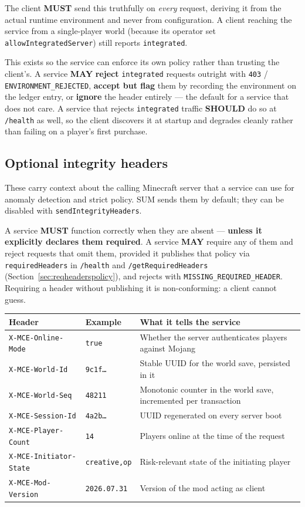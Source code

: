 \documentclass[11pt,a4paper]{article}
\newcommand{\code}[1]{\texttt{\small #1}}
\newcommand{\req}{\textbf{MUST}}
\newcommand{\rec}{\textbf{SHOULD}}
\newcommand{\opt}{\textbf{MAY}}
\begin{document}
The client \req{} send this truthfully on \emph{every} request, deriving it from the actual runtime
environment and never from configuration. A client reaching the service from a single-player world
(because its operator set \code{allowIntegratedServer}) still reports \code{integrated}.

This exists so the service can enforce its own policy rather than trusting the client's. A service
\opt{} \textbf{reject} \code{integrated} requests outright with \code{403} /
\code{ENVIRONMENT\_REJECTED}, \textbf{accept but flag} them by recording the environment on the
ledger entry, or \textbf{ignore} the header entirely --- the default for a service that does not
care. A service that rejects \code{integrated} traffic \rec{} do so at \code{/health} as well, so
the client discovers it at startup and degrades cleanly rather than failing on a player's first
purchase.

\subsection{Optional integrity headers}
\label{sec:integrity}

These carry context about the calling Minecraft server that a service can use for anomaly detection
and strict policy. SUM sends them by default; they can be disabled with
\code{sendIntegrityHeaders}.

A service \req{} function correctly when they are absent --- \textbf{unless it explicitly
declares them required}. A service \opt{} require any of them and reject requests that omit
them, provided it publishes that policy via \code{requiredHeaders} in \code{/health} and
\code{/getRequiredHeaders} (Section~\ref{sec:reqheaderspolicy}), and rejects with
\code{MISSING\_REQUIRED\_HEADER}. Requiring a header without publishing it is non-conforming:
a client cannot guess.

\begin{tabularx}{\linewidth}{L{4.6cm} L{2.0cm} X}
\toprule
\textbf{Header} & \textbf{Example} & \textbf{What it tells the service}\\
\midrule
\code{X-MCE-Online-Mode}     & \code{true}         & Whether the server authenticates players against Mojang\\
\code{X-MCE-World-Id}        & \code{9c1f\ldots}   & Stable UUID for the world save, persisted in it\\
\code{X-MCE-World-Seq}       & \code{48211}        & Monotonic counter in the world save, incremented per transaction\\
\code{X-MCE-Session-Id}      & \code{4a2b\ldots}   & UUID regenerated on every server boot\\
\code{X-MCE-Player-Count}    & \code{14}           & Players online at the time of the request\\
\code{X-MCE-Initiator-State} & \code{creative,op}  & Risk-relevant state of the initiating player\\
\code{X-MCE-Mod-Version}     & \code{2026.07.31}   & Version of the mod acting as client\\
\bottomrule
\end{tabularx}
\end{document}
